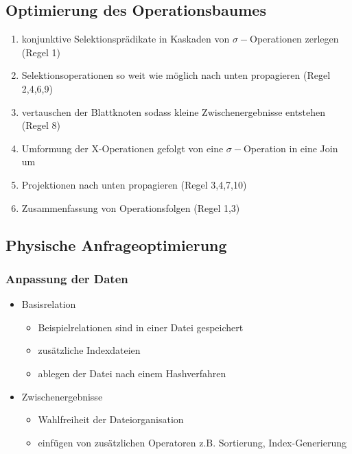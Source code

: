\documentclass[a4paper]{article}
\begin{document}
    \subsection{Optimierung des Operationsbaumes}
    \begin{enumerate}
        \item konjunktive Selektionsprädikate in Kaskaden von $\sigma -$Operationen zerlegen (Regel 1)
        \item Selektionsoperationen so weit wie möglich nach unten propagieren (Regel 2,4,6,9)
        \item vertauschen der Blattknoten sodass kleine Zwischenergebnisse entstehen (Regel 8)
        \item Umformung der X-Operationen gefolgt von eine $\sigma -$Operation in eine Join um
        \item Projektionen nach unten propagieren (Regel 3,4,7,10)
        \item Zusammenfassung von Operationsfolgen (Regel 1,3)
    \end{enumerate}

\subsection{Physische Anfrageoptimierung}
    \subsubsection{Anpassung der Daten}
    \begin{itemize}
        \item Basisrelation
        \begin{itemize}
            \item Beispielrelationen sind in einer Datei gespeichert
            \item zusätzliche Indexdateien
            \item ablegen der Datei nach einem Hashverfahren
        \end{itemize}
        
        \item Zwischenergebnisse
        \begin{itemize}
            \item Wahlfreiheit der Dateiorganisation
            \item einfügen von zusätzlichen Operatoren z.B. Sortierung, Index-Generierung
        \end{itemize}
    \end{itemize}
    
\end{document}
